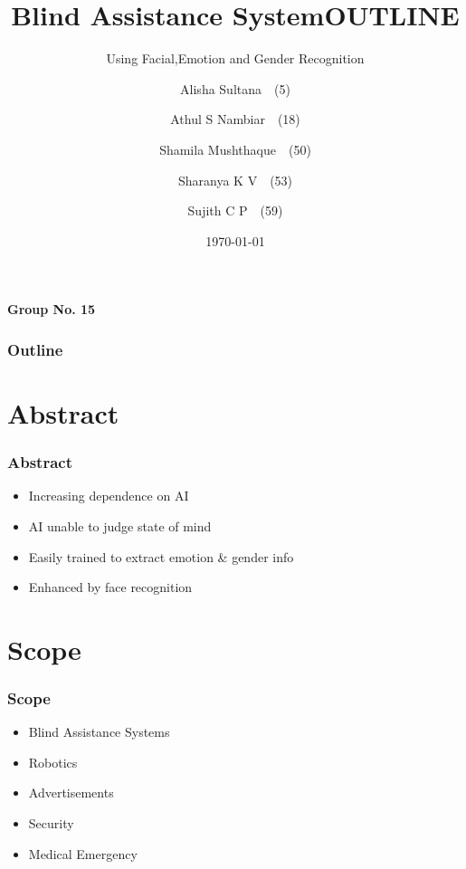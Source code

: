 \documentclass{beamer}
\title[Blind Assistance System]{Blind Assistance System}
\subtitle{Using Facial,Emotion and Gender Recognition}
\author[Alisha\and Athul\and Shamila\and Sharanya\and Sujith]{
	Alisha Sultana\ \ (5) \\ \and
	Athul S Nambiar\ \ (18) \\ \and 
	Shamila Mushthaque\ \ (50) \\ \and
	Sharanya K V\ \ (53)  \\ \and
	Sujith C P\ \ (59)}
\institute{Govt. College of Engineering, Kannur}
\date{\today}
\begin{document}
	\begin{frame}
	\begin{flushright}
	\textbf{Group No. 15}
	\end{flushright}
		\titlepage
	
	\end{frame}

	\begin{frame}
	
		\title{OUTLINE}
		\frametitle{Outline}
		\tableofcontents
	
	\end{frame}

		
	\section{Abstract}
	
	\begin{frame}
			
		\frametitle{Abstract}
		
			\justifying
		\begin{itemize}
			\item Increasing dependence on AI\newline
			\item AI unable to judge state of mind\newline
			\item Easily trained to extract emotion \& gender info\newline
			\item Enhanced by face recognition\newline
		\end{itemize}
	\end{frame}
	
	\section{Scope}
	
	\begin{frame}
	
		\frametitle{Scope}
	
		\begin{itemize}
			\item Blind Assistance Systems\newline
			\item Robotics\newline
			\item Advertisements\newline
			\item Security\newline
			\item Medical Emergency\newline
		\end{itemize}
		
	\end{frame}
	
\end{document}
